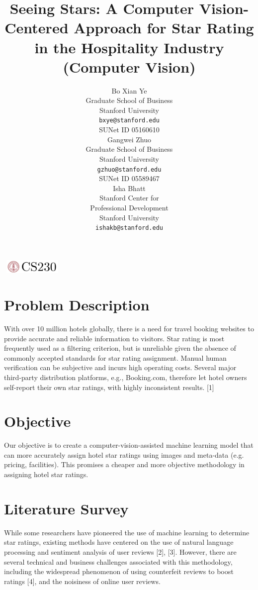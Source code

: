 \documentclass{article}
\title{Seeing Stars: A Computer Vision-Centered Approach for Star Rating in the Hospitality Industry \\
(Computer Vision)}
\author{
  Bo Xian Ye \\
  Graduate School of Business\\
  Stanford University\\
  \texttt{bxye@stanford.edu} \\
  SUNet ID 05160610\\
  \And
  Gangwei Zhuo \\
  Graduate School of Business\\
  Stanford University \\
  \texttt{gzhuo@stanford.edu} \\
  SUNet ID 05589467\\
  \And
  Isha Bhatt \\
  Stanford Center for \\
  Professional Development \\
  Stanford University \\
  \texttt{ishakb@stanford.edu} \\
}
\begin{document}

\begin{center}
\includegraphics[width=3cm, height=0.7cm]{CS230}
\end{center}

\maketitle

\section{Problem Description}	
With over 10 million hotels globally, there is a need for travel booking websites to provide accurate and reliable information to visitors. Star rating is most frequently used as a filtering criterion, but is unreliable given the absence of commonly accepted standards for star rating assignment. Manual human verification can be subjective and incurs high operating costs. Several major third-party distribution platforms, e.g., Booking.com, therefore let hotel owners self-report their own star ratings, with highly inconsistent results. [1]

\section{Objective}	
\par Our objective is to create a computer-vision-assisted machine learning model that can more accurately assign hotel star ratings using images and meta-data (e.g. pricing, facilities). This promises a cheaper and more objective methodology in assigning hotel star ratings.

\section{Literature Survey}
While some researchers have pioneered the use of machine learning to determine star ratings, existing methods have centered on the use of natural language processing and sentiment analysis of user reviews [2], [3]. However, there are several technical and business challenges associated with this methodology, including the widespread phenomenon of using counterfeit reviews to boost ratings [4], and the noisiness of online user reviews. 
\end{document}

